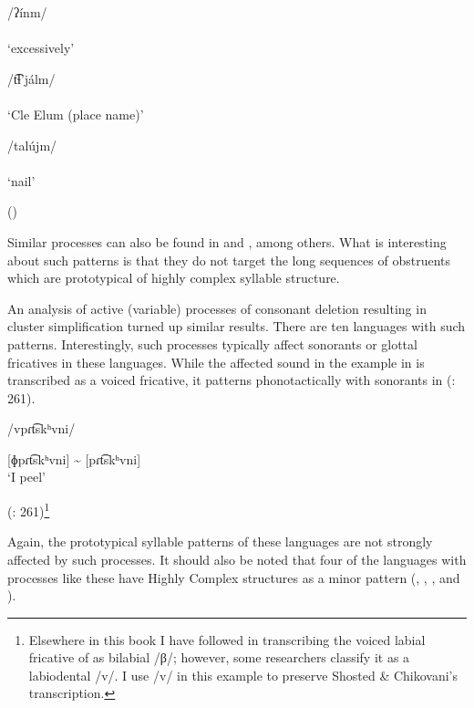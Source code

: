 \ea\label{ex:8.7}
{\setlength\multicolsep{0pt}\begin{multicols}{2}\raggedcolumns
\ea  /ʔínm/\\\relax
  [ʔínɨm]\\
  \glt ‘excessively’

\ex  /t͡ɬ’jálm/\\\relax
  [t͡ɬ’jálɨm]\\
  \glt ‘Cle Elum (place name)’\columnbreak

\ex  /talújm/\\\relax
  [talújɨm]\\
  \glt ‘nail’
\z\end{multicols}}
(\citealt[28]{HargusBeavert2006})
\z

\pagebreak Similar processes can also be found in  and , among others. What is interesting about such patterns is that they do not target the long sequences of obstruents which are prototypical of highly complex syllable structure.

  An analysis of active (variable) processes of consonant deletion resulting in cluster simplification turned up similar results. There are ten languages with such patterns. Interestingly, such processes typically affect sonorants or glottal fricatives in these languages. While the affected sound in the example in  is transcribed as a voiced fricative, it patterns phonotactically with sonorants in  (\citealt{ShostedChikovani2006}: 261).

\ea\label{ex:8.8}

/vpɾt͡skʰvni/

[ɸpɾt͡skʰvni] {\textasciitilde} [pɾt͡skʰvni]\\
\glt ‘I peel’

(\citealt{ShostedChikovani2006}: 261)\footnote{{Elsewhere in this book I have followed \citet{Aronson1991} in transcribing the voiced labial fricative of  as bilabial /β/; however, some researchers classify it as a labiodental /v/. I use /v/ in this example to preserve Shosted \& Chikovani’s transcription.}}
\z

Again, the prototypical syllable patterns of these languages are not strongly affected by such processes. It should also be noted that four of the languages with processes like these have Highly Complex structures as a minor pattern (, , , and ).


